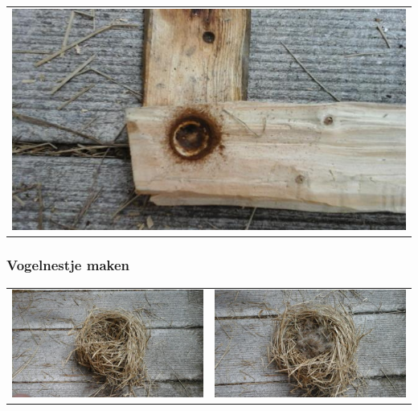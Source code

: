 \documentclass[a4paper, handout]{beamer}
\begin{document}
\begin{frame}
\begin{tabular}{ c c }
		\\
		\multicolumn{2}{c}{ \includegraphics[scale=0.16]{indraaien-5}}
	\end{tabular}
\end{frame}

\begin{frame}
	\frametitle{Vogelnestje maken}
	\begin{tabular}{ c c }
		\includegraphics[scale=0.2]{nestje-1}
		&
		\includegraphics[scale=0.2]{nestje-2}
		\\
	\end{tabular}
\end{frame}
\end{document}
